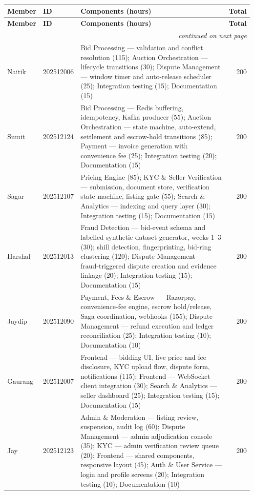 \documentclass[11pt, a4paper]{article}
\begin{document}
{\small
\begin{longtable}{@{}l l p{2.8in} r@{}}
\toprule
\textbf{Member} & \textbf{ID} & \textbf{Components (hours)} & \textbf{Total} \\
\midrule
\endfirsthead
\toprule
\textbf{Member} & \textbf{ID} & \textbf{Components (hours)} & \textbf{Total} \\
\midrule
\endhead
\midrule
\multicolumn{4}{r}{\footnotesize\emph{continued on next page}}\\
\endfoot
\bottomrule
\endlastfoot
Naitik & 202512006 & Bid Processing --- validation and conflict resolution (115); Auction Orchestration --- lifecycle transitions (30); Dispute Management --- window timer and auto-release scheduler (25); Integration testing (15); Documentation (15) & 200 \\
\addlinespace
Sumit & 202512124 & Bid Processing --- Redis buffering, idempotency, Kafka producer (55); Auction Orchestration --- state machine, auto-extend, settlement and escrow-hold transitions (85); Payment --- invoice generation with convenience fee (25); Integration testing (20); Documentation (15) & 200 \\
\addlinespace
Sagar & 202512107 & Pricing Engine (85); KYC \& Seller Verification --- submission, document store, verification state machine, listing gate (55); Search \& Analytics --- indexing and query layer (30); Integration testing (15); Documentation (15) & 200 \\
\addlinespace
Harshal & 202512013 & Fraud Detection --- bid-event schema and labelled synthetic dataset generator, weeks 1--3 (30); shill detection, fingerprinting, bid-ring clustering (120); Dispute Management --- fraud-triggered dispute creation and evidence linkage (20); Integration testing (15); Documentation (15) & 200 \\
\addlinespace
Jaydip & 202512090 & Payment, Fees \& Escrow --- Razorpay, convenience-fee engine, escrow hold/release, Saga coordination, webhooks (155); Dispute Management --- refund execution and ledger reconciliation (25); Integration testing (10); Documentation (10) & 200 \\
\addlinespace
Gaurang & 202512007 & Frontend --- bidding UI, live price and fee disclosure, KYC upload flow, dispute form, notifications (115); Frontend --- WebSocket client integration (30); Search \& Analytics --- seller dashboard (25); Integration testing (15); Documentation (15) & 200 \\
\addlinespace
Jay & 202512123 & Admin \& Moderation --- listing review, suspension, audit log (60); Dispute Management --- admin adjudication console (35); KYC --- admin verification review queue (20); Frontend --- shared components, responsive layout (45); Auth \& User Service --- login and profile screens (20); Integration testing (10); Documentation (10) & 200 \\

\end{longtable}}
\end{document}
